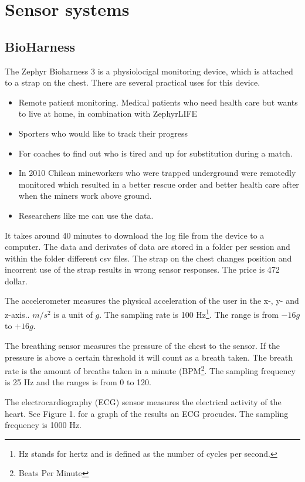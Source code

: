 \section{Sensor systems}
	\subsection{BioHarness}
			The Zephyr Bioharness 3\cite{bioharness} is a physiolocigal monitoring device, which is attached to a strap on the chest. There are several practical uses for this device.
			\begin{itemize}
				\item Remote patient monitoring. Medical patients who need health care but wants to live at home, in combination with ZephyrLIFE \texttrademark \cite{bhpatients}
				\item Sporters who would like to track their progress 
				\item For coaches to find out who is tired and up for substitution during a match. \cite{bhsport}
				\item In 2010 Chilean mineworkers who were trapped underground were remotedly monitored which resulted in a better rescue order and better health care after when the miners work above ground. \cite{chile}
				\item Researchers like me can use the data.
			\end{itemize}
			It takes around 40 minutes to download the log file from the device to a computer. \cite{bhdatasheet} The data and derivates of data are stored in a folder per session and within the folder different csv files. The strap on the chest changes position and incorrent use of the strap results in wrong sensor responses.
			The price is 472 dollar.
		
			The accelerometer measures the physical acceleration of the user in the x-, y- and z-axis.. $m/s^2$ is a unit of $g$. The sampling rate is 100 Hz\footnote{Hz stands for hertz and is defined as the number of cycles per second.}. The range is from $-16g$ to $+16g$.

			The breathing sensor measures the pressure of the chest to the sensor. If the pressure is above a certain threshold it will count as a breath taken. The breath rate is the amount of breaths taken in a minute (BPM\footnote{Beats Per Minute}. The sampling frequency is 25 Hz and the ranges is from 0 to 120.

			The electrocardiography (ECG) sensor measures the electrical activity of the heart.\cite{ECG} See Figure 1. for a graph of the results an ECG procudes. The sampling frequency is 1000 Hz.

